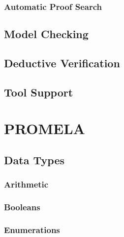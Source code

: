 \documentclass[a4paper, 11pt, accentcolor = tud3b]{tudreport}
\begin{document}
            \subsection{Automatic Proof Search} %

        \section{Model Checking} %

        \section{Deductive Verification} %

        \section{Tool Support} %

    \chapter{PROMELA} %

        \section{Data Types} %

            \subsection{Arithmetic} %

            \subsection{Booleans} %

            \subsection{Enumerations} %
\end{document}
